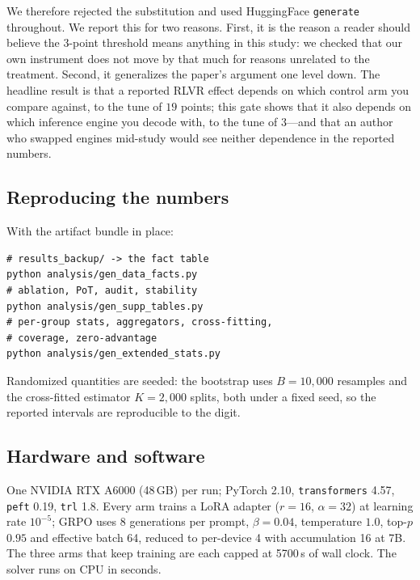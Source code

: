 We therefore rejected the substitution and used HuggingFace \texttt{generate}
throughout. We report this for two reasons. First, it is the reason a reader
should believe the $3$-point threshold means anything in this study: we checked
that our own instrument does not move by that much for reasons unrelated to the
treatment. Second, it generalizes the paper's argument one level down. The
headline result is that a reported RLVR effect depends on which control arm you
compare against, to the tune of $19$ points; this gate shows that it also depends
on which inference engine you decode with, to the tune of $3$---and that an
author who swapped engines mid-study would see neither dependence in the
reported numbers.

\subsection{Reproducing the numbers}

With the artifact bundle in place:

\begin{verbatim}
# results_backup/ -> the fact table
python analysis/gen_data_facts.py
# ablation, PoT, audit, stability
python analysis/gen_supp_tables.py
# per-group stats, aggregators, cross-fitting,
# coverage, zero-advantage
python analysis/gen_extended_stats.py
\end{verbatim}

Randomized quantities are seeded: the bootstrap uses $B = 10{,}000$ resamples
and the cross-fitted estimator $K = 2{,}000$ splits, both under a fixed seed, so
the reported intervals are reproducible to the digit.

\subsection{Hardware and software}

One NVIDIA RTX A6000 (48\,GB) per run; PyTorch 2.10, \texttt{transformers}
4.57, \texttt{peft} 0.19, \texttt{trl} 1.8. Every arm trains a LoRA adapter
($r{=}16$, $\alpha{=}32$) at learning rate $10^{-5}$; GRPO uses 8 generations
per prompt, $\beta{=}0.04$, temperature $1.0$, top-$p$ $0.95$ and effective
batch 64, reduced to per-device 4 with accumulation 16 at 7B. The three arms
that keep training are each capped at 5700\,s of wall clock. The solver runs on
CPU in seconds.
